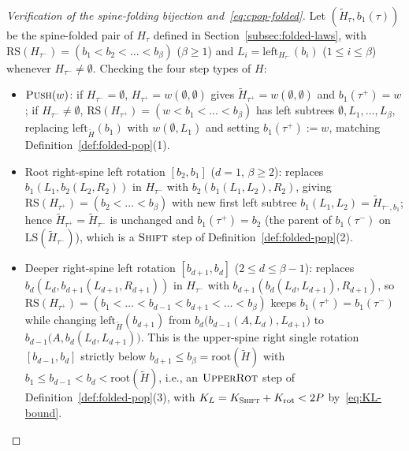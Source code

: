 \documentclass[11pt]{article}
\theoremstyle{definition}
\theoremstyle{remark}
\newcommand{\LS}{\mathrm{LS}}
\newcommand{\RS}{\mathrm{RS}}
\newcommand{\PUSH}{\textnormal{\scshape Push}}
\newcommand{\SHIFT}{\textnormal{\scshape Shift}}
\newcommand{\UPROT}{\textnormal{\scshape UpperRot}}
\begin{document}
\begin{proof}[Verification of the spine-folding bijection and~\eqref{eq:cpop-folded}]
Let $(\widetilde{H}_\tau, b_1(\tau))$ be the spine-folded pair of $H_\tau$ defined in Section~\ref{subsec:folded-laws}, with $\RS(H_{\tau^-}) = (b_1 < b_2 < \dots < b_\beta)$ ($\beta \ge 1$) and $L_i = \mathrm{left}_{H_{\tau^-}}(b_i)$ ($1 \le i \le \beta$) whenever $H_{\tau^-} \ne \emptyset$. Checking the four step types of $H$:
\begin{itemize}[leftmargin=2em]
  \item $\PUSH(w)$: if $H_{\tau^-} = \emptyset$, $H_{\tau^+} = w(\emptyset, \emptyset)$ gives $\widetilde{H}_{\tau^+} = w(\emptyset, \emptyset)$ and $b_1(\tau^+) = w$; if $H_{\tau^-} \ne \emptyset$, $\RS(H_{\tau^+}) = (w < b_1 < \dots < b_\beta)$ has left subtrees $\emptyset, L_1, \dots, L_\beta$, replacing $\mathrm{left}_{\widetilde{H}}(b_1)$ with $w(\emptyset, L_1)$ and setting $b_1(\tau^+) := w$, matching Definition~\ref{def:folded-pop}(1).
  \item Root right-spine left rotation $[b_2, b_1]$ ($d = 1$, $\beta \ge 2$): replaces $b_1(L_1, b_2(L_2, R_2))$ in $H_{\tau^-}$ with $b_2(b_1(L_1, L_2), R_2)$, giving $\RS(H_{\tau^+}) = (b_2 < \dots < b_\beta)$ with new first left subtree $b_1(L_1, L_2) = \widetilde{H}_{\tau^-, b_1}$; hence $\widetilde{H}_{\tau^+} = \widetilde{H}_{\tau^-}$ is unchanged and $b_1(\tau^+) = b_2$ (the parent of $b_1(\tau^-)$ on $\LS(\widetilde{H}_{\tau^-})$), which is a $\SHIFT$ step of Definition~\ref{def:folded-pop}(2).
  \item Deeper right-spine left rotation $[b_{d+1}, b_d]$ ($2 \le d \le \beta - 1$): replaces $b_d(L_d, b_{d+1}(L_{d+1}, R_{d+1}))$ in $H_{\tau^-}$ with $b_{d+1}(b_d(L_d, L_{d+1}), R_{d+1})$, so $\RS(H_{\tau^+}) = (b_1 < \dots < b_{d-1} < b_{d+1} < \dots < b_\beta)$ keeps $b_1(\tau^+) = b_1(\tau^-)$ while changing $\mathrm{left}_{\widetilde{H}}(b_{d+1})$ from $b_d\big(b_{d-1}(A, L_d), L_{d+1}\big)$ to $b_{d-1}\big(A, b_d(L_d, L_{d+1})\big)$. This is the upper-spine right single rotation $[b_{d-1}, b_d]$ strictly below $b_{d+1} \le b_\beta = \mathrm{root}(\widetilde{H})$ with $b_1 \le b_{d-1} < b_d < \mathrm{root}(\widetilde{H})$, i.e., an $\UPROT$ step of Definition~\ref{def:folded-pop}(3), with $K_L = K_{\SHIFT} + K_{\mathrm{rot}} < 2P$ by~\eqref{eq:KL-bound}.

\end{itemize}
\end{proof}
\end{document}
